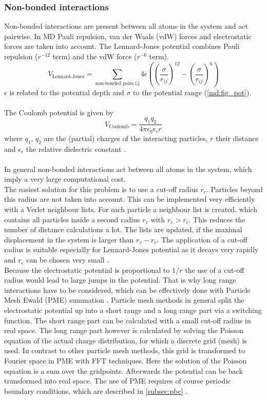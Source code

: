 \subsubsection{Non-bonded interactions}
Non-bonded interactions are present between all atoms in the system and act pairwise. In MD Pauli repulsion, van der Waals (vdW) forces and electrostatic forces are taken into account.
The Lennard-Jones potential combines Pauli repulsion ($r^{-12}$ term) and the vdW force ($r^{-6}$ term).
\begin{equation}
V_\text{Lennard-Jones} = \sum_{\text{non-bonded pairs i,j}} 4 \epsilon\left(\left(\frac{\sigma}{r_{ij}}\right)^{12} - \left(\frac{\sigma}{r_{ij}}\right)^6\right)
\end{equation}
$\epsilon$ is related to the potential depth and $\sigma$ to the potential range (\autoref{md:fig_pot}).\\
\\
The Coulomb potential is given by
\begin{equation}
V_\text{Coulomb} = \frac{q_1 q_2}{4 \pi \epsilon_0 \epsilon_r r}
\end{equation}
where $q_1$, $q_2$ are the (partial) charges of the interacting particles, $r$ their distance and $\epsilon_r$ the relative dielectric constant \autocite[p. 65-71]{gromacsManual}.\\
\\
In general non-bonded interactions act between all atoms in the system, which imply a very large computational cost.\\
The easiest solution for this problem is to use a cut-off radius $r_c$. Particles beyond this radius are not taken into account. This can be implemented very efficiently with a Verlet neighbour lists. For each particle a neighbour list is created, which contains all particles inside a second radius $r_v$ with $r_v > r_c$. This reduces the number of distance calculations a lot. The lists are updated, if the maximal displacement in the system is larger than $r_v - r_c$.  The application of a cut-off radius is suitable especially for Lennard-Jones potential as it decays very rapidly and $r_c$ can be chosen very small \autocite[p. 144]{greenBook}.\\
Because the electrostatic potential is proportional to $1/r$ the use of a cut-off radius would lead to large jumps in the potential. That is why long range interactions have to be considered, which can be effectively done with Particle Mesh Ewald (PME) summation \autocite{pme}. Particle mesh methods in general split the electrostatic potential up into a short range and a long range part via a switching function. The short range part can be calculated with a small cut-off radius in real space. The long range part however is calculated by solving the Poisson equation of the actual charge distribution, for which a discrete grid (mesh) is used. In contrast to other particle mesh methods, this grid is transformed to Fourier space in PME with FFT techniques. Here the solution of the Poisson equation is a sum over the gridpoints. Afterwards the potential can be back transformed into real space. The use of PME requires of course periodic boundary conditions, which are described in \autoref{subsec:pbc} \autocite[p. 246-251]{greenBook}.
